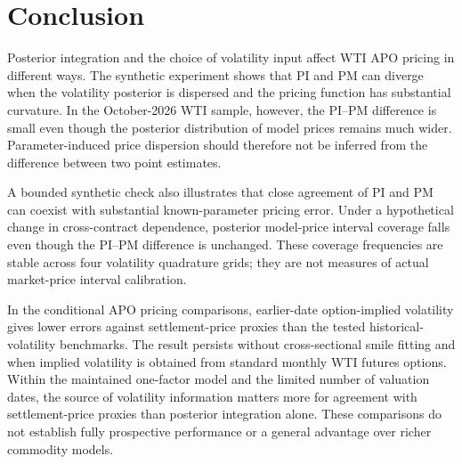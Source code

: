 \section{Conclusion}\label{sec:short_conclusion}

Posterior integration and the choice of volatility input affect WTI APO pricing in different ways. The synthetic experiment shows that PI and PM can diverge when the volatility posterior is dispersed and the pricing function has substantial curvature. In the October-2026 WTI sample, however, the PI--PM difference is small even though the posterior distribution of model prices remains much wider. Parameter-induced price dispersion should therefore not be inferred from the difference between two point estimates.

A bounded synthetic check also illustrates that close agreement of PI and PM
can coexist with substantial known-parameter pricing error. Under a hypothetical
change in cross-contract dependence, posterior model-price interval coverage
falls even though the PI--PM difference is unchanged. These coverage
frequencies are stable across four volatility quadrature grids;
they are not measures of actual market-price interval calibration.

In the conditional APO pricing comparisons, earlier-date option-implied volatility gives lower errors against settlement-price proxies than the tested historical-volatility benchmarks. The result persists without cross-sectional smile fitting and when implied volatility is obtained from standard monthly WTI futures options. Within the maintained one-factor model and the limited number of valuation dates, the source of volatility information matters more for agreement with settlement-price proxies than posterior integration alone. These comparisons do not establish fully prospective performance or a general advantage over richer commodity models.
